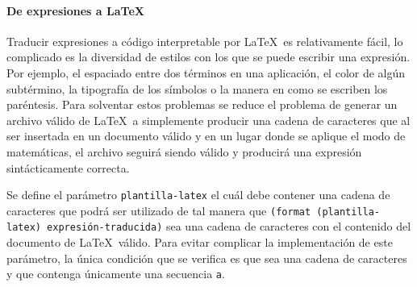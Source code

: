 \documentclass[letterpaper,twoside,openright,11pt]{book}
\begin{document}
\eatline
{}\nwendcode{}\nwdocspar

\nwenddocs{}\paragraph{De expresiones a \LaTeX} Traducir expresiones a código interpretable por \LaTeX~es relativamente fácil, lo complicado es la diversidad de estilos con los que se puede escribir una expresión. Por ejemplo, el espaciado entre dos términos en una aplicación, el color de algún subtérmino, la tipografía de los símbolos o la manera en como se escriben los paréntesis. Para solventar estos problemas se reduce el problema de generar un archivo válido de \LaTeX~a simplemente producir una cadena de caracteres que al ser insertada en un documento válido y en un lugar donde se aplique el modo de matemáticas, el archivo seguirá siendo válido y producirá una expresión sintácticamente correcta.

Se define el parámetro {\tt{}\protect{}plantilla-latex} el cuál debe contener una cadena de caracteres que podrá ser utilizado de tal manera que {\tt{}(format\ (\protect{}plantilla-latex)\ expresión-traducida)} sea una cadena de caracteres con el contenido del documento de \LaTeX~válido. Para evitar complicar la implementación de este parámetro, la única condición que se verifica es que sea una cadena de caracteres y que contenga únicamente una secuencia {\tt{}{}a}.
\end{document}
